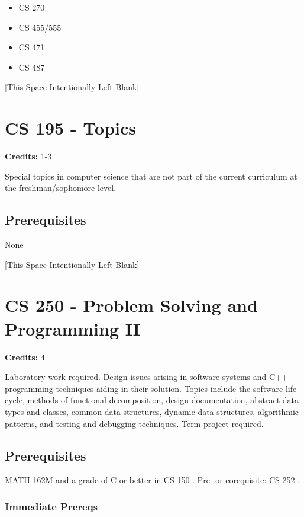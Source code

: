 \documentclass[]{article}
\providecommand{\tightlist}{%
  \setlength{\itemsep}{0pt}\setlength{\parskip}{0pt}}
\newcommand{\pagebreakhere}{
\vspace*{\fill}
\begin{center}
[This Space Intentionally Left Blank]
\end{center}
\vspace*{\fill}
\newpage
}
\begin{document}
\begin{itemize}
\tightlist
\item
  CS 270
\item
  CS 455/555
\item
  CS 471
\item
  CS 487
\end{itemize}

\pagebreakhere
\section{CS 195 - Topics}\label{cs-195---topics}

\textbf{Credits:} 1-3

Special topics in computer science that are not part of the current
curriculum at the freshman/sophomore level.

\subsection{Prerequisites}\label{prerequisites-7}

None

\pagebreakhere
\section{CS 250 - Problem Solving and Programming
II}\label{cs-250---problem-solving-and-programming-ii}

\textbf{Credits:} 4

Laboratory work required. Design issues arising in software systems and
C++ programming techniques aiding in their solution. Topics include the
software life cycle, methods of functional decomposition, design
documentation, abstract data types and classes, common data structures,
dynamic data structures, algorithmic patterns, and testing and debugging
techniques. Term project required.

\subsection{Prerequisites}\label{prerequisites-8}

MATH 162M and a grade of C or better in CS 150 . Pre- or corequisite: CS
252 .

\subsubsection{Immediate Prereqs}\label{immediate-prereqs-4}
\end{document}
